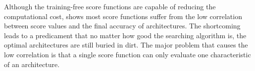 \documentclass[sigconf]{acmart}
\begin{document}
    Although the training-free score functions are capable of reducing the 
    computational cost,  shows most score functions suffer %
    from the low correlation between score values and the final accuracy of 
    architectures. The shortcoming leads to a predicament that no matter 
    how good the searching algorithm is, the optimal architectures are still 
    buried in dirt. %
    The major problem that causes the low correlation is that a single score 
    function can only evaluate one characteristic of an architecture. 
    \begin{table}[tb]
        \caption{\textsc{The Kendall correlation between training-free score and test accuracy, evaluated on the three datasets of NATS-Bench-TSS \cite{Dong_2021}. }}
    \end{table}
\end{document}
